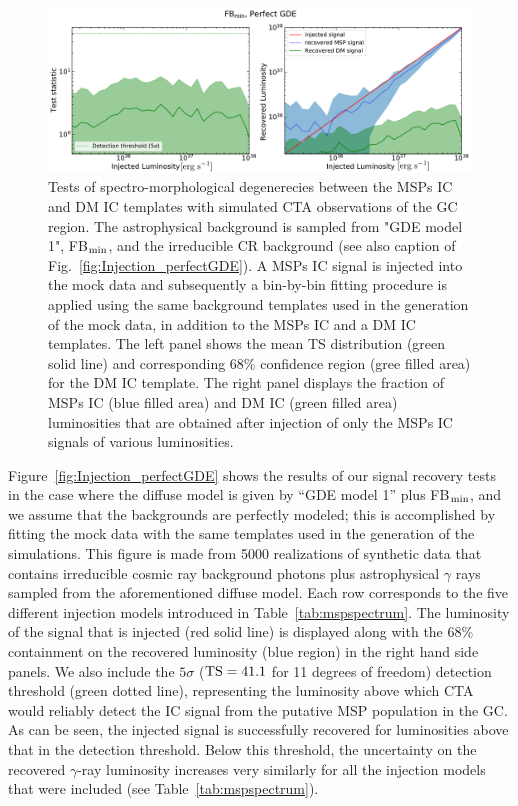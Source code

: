\documentclass[doublespace,draft,nopageskip]{VTthesis} %
\begin{document}
\begin{figure}
    \begin{center}
    \includegraphics[scale = 0.48]{Figures/CTA/TS-dm-mis-False-Fermi-min-True.pdf}
\caption{Tests of spectro-morphological degenerecies between the MSPs IC and DM IC templates with simulated CTA observations of the GC region. The astrophysical background is sampled from "GDE model 1", FB$_{\rm min}$, and the irreducible CR background (see also caption of Fig.~\ref{fig:Injection_perfectGDE}). A MSPs IC signal is injected into the mock data and subsequently a bin-by-bin fitting procedure is applied using the same background templates used in the generation of the mock data, in addition to the MSPs IC and a DM IC templates. The left panel shows the mean TS distribution (green solid line) and corresponding 68\% confidence region (gree filled area) for the DM IC template. The right panel displays the fraction of MSPs IC (blue filled area) and DM IC (green filled area) luminosities that are obtained after injection of only the MSPs IC signals of various luminosities. }\label{fig:MSPsvsDM_perfectGDE}
    \end{center}
\end{figure}


Figure~\ref{fig:Injection_perfectGDE} shows the results of our signal recovery tests in the case where the diffuse model is given by ``GDE model 1'' plus FB$_{\rm min}$, and we assume that the backgrounds are perfectly modeled; this is accomplished by fitting the mock data with the same templates used in the generation of the simulations. This figure is made from 5000 realizations of synthetic data that contains irreducible cosmic ray background photons plus astrophysical $\gamma$ rays sampled from the aforementioned diffuse model. Each row corresponds to the five different injection models introduced in Table~\ref{tab:mspspectrum}. The luminosity of the signal that is injected (red solid line) is displayed along with the 68\% containment on the recovered luminosity (blue region) in the right hand side panels. We also include the $5\sigma$ (${\rm TS}=41.1$ for 11 degrees of freedom) detection threshold (green dotted line), representing the luminosity above which CTA would reliably detect the IC signal from the putative MSP population in the GC. As can be seen, the injected signal is successfully recovered for luminosities above that in the detection threshold. Below this threshold, the uncertainty on the recovered $\gamma$-ray luminosity increases very similarly for all the injection models that were included (see Table~\ref{tab:mspspectrum}).     
\end{document}
